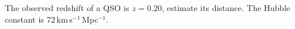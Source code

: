 The observed redshift of a QSO is $z = 0.20$, estimate its distance. The
Hubble constant is 72\,km\,s$^{-1}$\,Mpc$^{-1}$.
